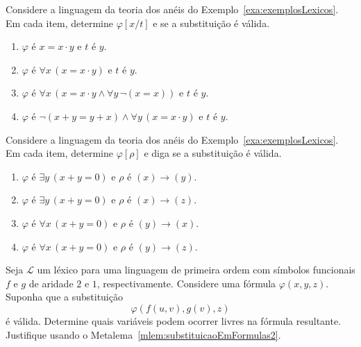 \begin{exercise}\label{exr:substituicaoEmFormulas}
    Considere a linguagem da teoria dos anéis do Exemplo~\ref{exa:exemplosLexicos}.
    Em cada item, determine $\varphi[x/t]$ e se a substituição é válida.
    \begin{enumerate}[label=(\alph*)]
        \item $\varphi$ é $x = x \cdot y$ e $t$ é $y$.
        \item $\varphi$ é $\forall x \, (x = x \cdot y)$ e $t$ é $y$.
        \item $\varphi$ é $\forall x \, (x = x \cdot y \wedge \forall y\, \neg (x = x))$ e $t$ é $y$.
        \item $\varphi$ é $ \neg (x+y =y+x) \wedge \forall y \, (x = x \cdot y)$ e $t$ é $y$.
    \end{enumerate}
\end{exercise}
\begin{exercise}\label{exr:substituicaoValidadeBasica}
    Considere a linguagem da teoria dos anéis do Exemplo~\ref{exa:exemplosLexicos}.
    Em cada item, determine $\varphi[\rho]$ e diga se a substituição é válida.
    \begin{enumerate}[label=(\alph*)]
        \item $\varphi$ é $\exists y\, (x+y=0)$ e $\rho$ é $(x)\to(y)$.
        \item $\varphi$ é $\exists y\, (x+y=0)$ e $\rho$ é $(x)\to(z)$.
        \item $\varphi$ é $\forall x\, (x+y=0)$ e $\rho$ é $(y)\to(x)$.
        \item $\varphi$ é $\forall x\, (x+y=0)$ e $\rho$ é $(y)\to(z)$.
    \end{enumerate}
\end{exercise}

\begin{exercise}\label{exr:variaveisLivresAposSubstituicao}
    Seja $\mathcal L$ um léxico para uma linguagem de primeira ordem com símbolos funcionais $f$ e $g$ de aridade $2$ e $1$, respectivamente.
    Considere uma fórmula $\varphi(x, y, z)$.
    Suponha que a substituição
    \[
        \varphi(f(u,v), g(v), z)
    \]
    é válida.
    Determine quais variáveis podem ocorrer livres na fórmula resultante.
    Justifique usando o Metalema~\ref{mlem:substituicaoEmFormulas2}.
\end{exercise}

